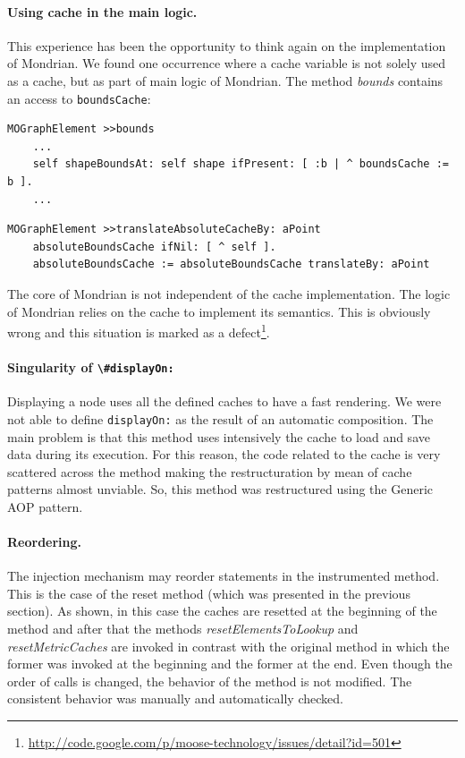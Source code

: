 \documentclass[preprint,10pt]{sigplanconf}
\newcommand{\ct}{\lstinline[backgroundcolor=\color{white},basicstyle=\footnotesize\ttfamily]}
\begin{document}
\paragraph{Using cache in the main logic.}
This experience has been the opportunity to think again on the implementation of Mondrian. We found one occurrence where a cache variable is not solely used as a cache, but as part of main logic of Mondrian. The method \emph{bounds} contains an access to \ct{boundsCache}: 

\begin{lstlisting} 
MOGraphElement >>bounds
	...
	self shapeBoundsAt: self shape ifPresent: [ :b | ^ boundsCache := b ].
	...
\end{lstlisting}

\begin{lstlisting} 
MOGraphElement >>translateAbsoluteCacheBy: aPoint
	absoluteBoundsCache ifNil: [ ^ self ].
	absoluteBoundsCache := absoluteBoundsCache translateBy: aPoint
\end{lstlisting}

The core of Mondrian is not independent of the cache implementation. The logic of Mondrian relies on the cache to implement its semantics. This is obviously wrong and this situation is marked as a defect\footnote{\url{http://code.google.com/p/moose-technology/issues/detail?id=501}}.

\paragraph{Singularity of \ct{\#displayOn:}} Displaying a node uses all the defined caches to have a fast rendering. We were not able to define \ct{displayOn:} as the result of an automatic composition. The main problem is that this method uses intensively the cache to load and save data during its execution. For this reason, the code related to the cache is very scattered across the method making the restructuration by mean of cache patterns almost unviable. So, this method was restructured using the Generic AOP pattern. 


\paragraph{Reordering.} The injection mechanism may reorder statements in the instrumented method. This is the case of the reset method (which was presented in the previous section). As shown, in this case the caches are resetted at the beginning of the method and after that the methods \emph{resetElementsToLookup} and \emph{resetMetricCaches} are invoked in contrast with the original method in which the former was invoked at the beginning and the former at the end. Even though the order of calls is changed, the behavior of the method is not modified. The consistent behavior was manually and automatically checked.
\end{document}
